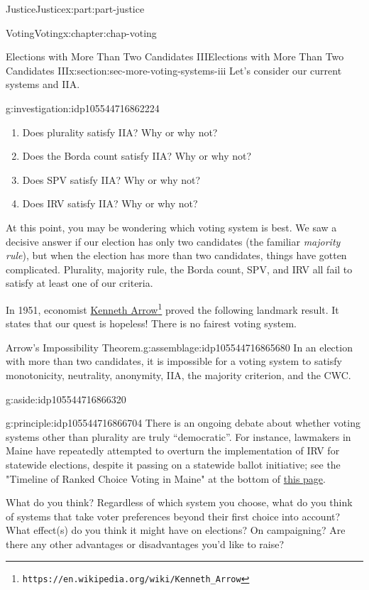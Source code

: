 \documentclass[oneside,10pt,]{book}
\newcommand{\xreffont}{\relax}
\numberwithin{equation}{section}
\providecommand\phantomsection{}
\begin{document}
\begin{partptx}{Justice}{}{Justice}{}{}{x:part:part-justice}
\begin{chapterptx}{Voting}{}{Voting}{}{}{x:chapter:chap-voting}
\begin{sectionptx}{Elections with More Than Two Candidates III}{}{Elections with More Than Two Candidates III}{}{}{x:section:sec-more-voting-systems-iii}
Let's consider our current systems and IIA.%
\begin{investigation}{}{g:investigation:idp105544716862224}%
%
\begin{enumerate}
\item{}Does plurality satisfy IIA? Why or why not?%
\item{}Does the Borda count satisfy IIA? Why or why not?%
\item{}Does SPV satisfy IIA? Why or why not?%
\item{}Does IRV satisfy IIA? Why or why not?%
\end{enumerate}
\end{investigation}%
At this point, you may be wondering which voting system is best. We saw a decisive answer if our election has only two candidates (the familiar \emph{majority rule}), but when the election has more than two candidates, things have gotten complicated. Plurality, majority rule, the Borda count, SPV, and IRV all fail to satisfy at least one of our criteria.%
\par
In 1951, economist \href{https://en.wikipedia.org/wiki/Kenneth_Arrow}{Kenneth Arrow}\footnote{\nolinkurl{https://en.wikipedia.org/wiki/Kenneth_Arrow}\label{g:fn:idp105544716865168}} proved the following landmark result. It states that our quest is hopeless! There is no fairest voting system.%
\begin{assemblage}{Arrow's Impossibility Theorem.}{g:assemblage:idp105544716865680}%
In an election with more than two candidates, it is impossible for a voting system to satisfy monotonicity, neutrality, anonymity, IIA, the majority criterion, and the CWC. \begin{aside}{}{g:aside:idp105544716866320}%
\end{aside}
%
\end{assemblage}
\begin{principle}{}{}{g:principle:idp105544716866704}%
There is an ongoing debate about whether voting systems other than plurality are truly ``democratic''. For instance, lawmakers in Maine have repeatedly attempted to overturn the implementation of IRV for statewide elections, despite it passing on a statewide ballot initiative; see the "Timeline of Ranked Choice Voting in Maine" at the bottom of \href{http://www.rcvmaine.com}{this page}\footnotemark{}.%
\par
What do you think? Regardless of which system you choose, what do you think of systems that take voter preferences beyond their first choice into account? What effect(s) do you think it might have on elections? On campaigning? Are there any other advantages or disadvantages you'd like to raise?%
\end{principle}
%
\end{sectionptx}
\end{chapterptx}
 \end{partptx}
%
\backmatter%
%
\clearpage\phantomsection%
%
%
{\xreffont\printindex}
%
\end{document}
